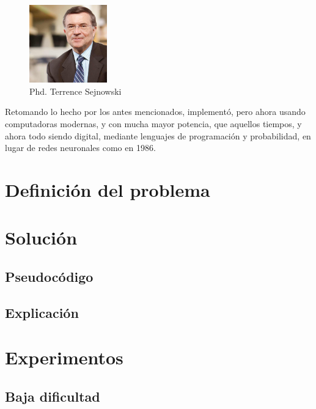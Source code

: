 \documentclass[
  spanish,
]{article}
\begin{document}
\begin{figure}
\centering
\includegraphics[width=0.3\textwidth,height=\textheight]{img/README/terrence.jpg}
\caption{Phd. Terrence Sejnowski}
\end{figure}

Retomando lo hecho por los antes mencionados, implementó, pero ahora
usando computadoras modernas, y con mucha mayor potencia, que aquellos
tiempos, y ahora todo siendo digital, mediante lenguajes de programación
y probabilidad, en lugar de redes neuronales como en 1986.

\hypertarget{definiciuxf3n-del-problema}{%
\section{Definición del problema}\label{definiciuxf3n-del-problema}}

\hypertarget{soluciuxf3n}{%
\section{Solución}\label{soluciuxf3n}}

\hypertarget{pseudocuxf3digo}{%
\subsection{Pseudocódigo}\label{pseudocuxf3digo}}

\hypertarget{explicaciuxf3n}{%
\subsection{Explicación}\label{explicaciuxf3n}}

\hypertarget{experimentos}{%
\section{Experimentos}\label{experimentos}}

\hypertarget{baja-dificultad}{%
\subsection{Baja dificultad}\label{baja-dificultad}}
\end{document}
